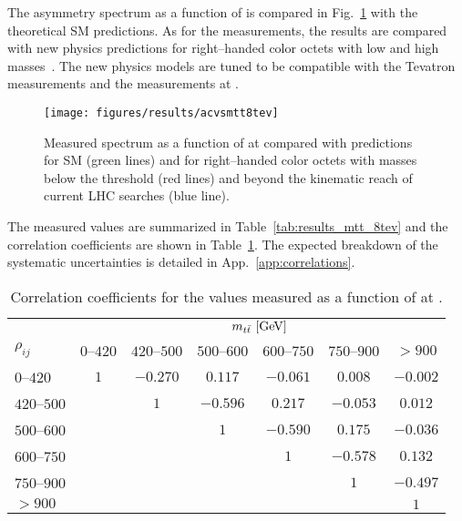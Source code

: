 The asymmetry spectrum as a function of \mtt{} is compared in
Fig.~\ref{fig:8tevacvsmtt} with the theoretical SM predictions.
As for the \seventev{} measurements, the results are compared with new
physics predictions for right--handed color octets with low and high
masses~\cite{Aguilar-Saavedra:2014nja}. The new physics models are
tuned to be compatible with the Tevatron \afb{} measurements and the
\ac{} measurements at \seventev{}.
\begin{figure}[!htb]\centering
  \texttt{[image: figures/results/acvsmtt8tev]}
  \caption{Measured \ac{} spectrum as a function of \mtt{} at
    \seventev{} compared with predictions for SM (green lines) and for right--handed
    color octets with masses below the \ttbar{} threshold (red lines) and beyond
    the kinematic reach of current LHC searches (blue line).}
  \label{fig:8tevacvsmtt}
\end{figure}
The measured \ac{} values are summarized in
Table~\ref{tab:results_mtt_8tev} and the correlation coefficients are
shown in Table~\ref{tab:corr_mtt8tev}. The expected breakdown of the
systematic uncertainties is detailed in App.~\ref{app:correlations}.

%
\begin{table}[!htp]\centering
\begin{tabular}{l c c c c c c}
  \toprule
  &\multicolumn{6}{c}{$m_{t\bar{t}}{}~[\rm{GeV}]$}    \\
  $\rho_{ij}$ & $0$--$420$ & $420$--$500$ & $500$--$600$ &
  $600$--$750$ & $750$--$900$ & $>900$ \\
  \midrule
  $0$--$420$      & $1$ & $-0.270$ & $0.117$ & $-0.061$ & $0.008$ & $-0.002$ \\
  $420$--$500$    &     & $1$           & $-0.596$ & $0.217$ &
  $-0.053$ & $0.012$ \\
  $500$--$600$    &     &                   & $1$          & $-0.590$
  & $0.175$ & $-0.036$ \\
  $600$--$750$    &     &         &         & $1$     & $-0.578$ & $0.132$ \\
  $750$--$900$    &     &         &         &            & $1$ & $-0.497$ \\
  $>900$               &     &         &         &         &   &$1$     \\
  \bottomrule
\end{tabular}
\caption{Correlation coefficients for the \ac{} values measured as a
  function of \mtt{} at \eighttev{}.}
\label{tab:corr_mtt8tev}
\end{table}

